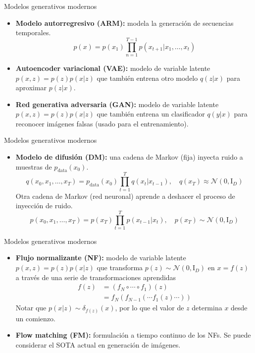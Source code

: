 \documentclass{beamer}
\begin{document}
\begin{frame}{Modelos generativos modernos}
    \begin{itemize}
        \item \textbf{Modelo autorregresivo (ARM):} modela la generación de secuencias temporales.
              \begin{equation*}
                  p(x)=p(x_1)\prod_{n=1}^{T-1} p(x_{t+1}|x_1,\ldots,x_t)
              \end{equation*}
        \item \textbf{Autoencoder variacional (VAE):} modelo de variable latente $p(x,z)=p(z)p(x|z)$ que también entrena otro modelo $q(z|x)$ para aproximar $p(z|x)$.
        \item \textbf{Red generativa adversaria (GAN):} modelo de variable latente $p(x,z)=p(z)p(x|z)$ que también entrena un clasificador $q(y|x)$ para reconocer imágenes falsas (usado para el entrenamiento).
    \end{itemize}
\end{frame}

\begin{frame}{Modelos generativos modernos}
    \begin{itemize}
        \item \textbf{Modelo de difusión (DM):} una cadena de Markov (fija) inyecta ruido a muestras de $p_\text{data}(x_0)$.
              \begin{equation*}
                  q(x_0,x_1,\ldots,x_T)=p_\text{data}(x_0)\prod_{t=1}^T q(x_t|x_{t-1}),
                  \quad q(x_T)\approx\mathcal{N}(0,\text{I}_D)
              \end{equation*}
              Otra cadena de Markov (red neuronal) aprende a deshacer el proceso de inyección de ruido.
              \begin{equation*}
                  p(x_0,x_1,\ldots,x_T)=p(x_T)\prod_{t=1}^T p(x_{t-1}|x_t),
                  \quad p(x_T)\sim\mathcal{N}(0,\text{I}_D)
              \end{equation*}
    \end{itemize}
\end{frame}

\begin{frame}{Modelos generativos modernos}
    \begin{itemize}
        \item \textbf{Flujo normalizante (NF):} modelo de variable latente $p(x,z)=p(z)p(x|z)$ que transforma $p(z)\sim\mathcal{N}(0,\text{I}_D)$ en $x=f(z)$ a través de una serie de transformaciones aprendidas
              \begin{align*}
                  f(z) & =(f_N\circ\cdots\circ f_1)(z)      \\
                       & =f_N(f_{N-1}(\cdots f_1(z)\cdots))
              \end{align*}
              Notar que $p(x|z)\sim\delta_{f(z)}(x)$, por lo que el valor de $z$ determina $x$ desde un comienzo.
        \item \textbf{Flow matching (FM):} formulación a tiempo continuo de los NFs. Se puede considerar el SOTA actual en generación de imágenes.
    \end{itemize}
\end{frame}
\end{document}
